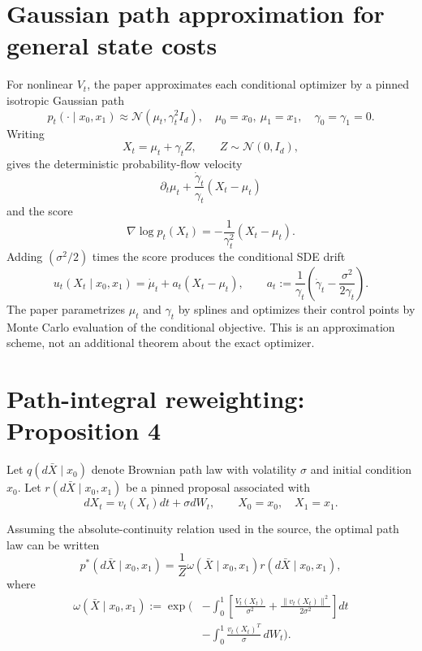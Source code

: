 \section{Gaussian path approximation for general state costs}
For nonlinear $V_t$, the paper approximates each conditional optimizer by a
pinned isotropic Gaussian path
\begin{equation}
  p_t(\cdot\mid x_0,x_1)
  \approx\mathcal N(\mu_t,\gamma_t^2I_d),
  \quad
  \mu_0=x_0,\ \mu_1=x_1,
  \quad
  \gamma_0=\gamma_1=0.
  \tag{7}\label{eq:gsbm-gaussian-path}
\end{equation}
Writing
\[
  X_t=\mu_t+\gamma_t Z,
  \qquad Z\sim\mathcal N(0,I_d),
\]
gives the deterministic probability-flow velocity
\[
  \partial_t\mu_t+\frac{\dot\gamma_t}{\gamma_t}(X_t-\mu_t)
\]
and the score
\[
  \nabla\log p_t(X_t)=-\frac{1}{\gamma_t^2}(X_t-\mu_t).
\]
Adding $(\sigma^2/2)$ times the score produces the conditional SDE drift
\begin{equation}
  u_t(X_t\mid x_0,x_1)
  =\dot\mu_t+a_t(X_t-\mu_t),
  \qquad
  a_t:=\frac1{\gamma_t}
  \left(\dot\gamma_t-\frac{\sigma^2}{2\gamma_t}\right).
  \tag{8}\label{eq:gsbm-gaussian-drift}
\end{equation}
The paper parametrizes $\mu_t$ and $\gamma_t$ by splines and optimizes their
control points by Monte Carlo evaluation of the conditional objective.  This is
an approximation scheme, not an additional theorem about the exact optimizer.

\section{Path-integral reweighting: Proposition 4}
Let $q(d\bar X\mid x_0)$ denote Brownian path law with volatility $\sigma$ and
initial condition $x_0$.  Let $r(d\bar X\mid x_0,x_1)$ be a pinned proposal
associated with
\[
  dX_t=v_t(X_t)dt+\sigma dW_t,
  \qquad X_0=x_0,
  \quad X_1=x_1.
\]

\begin{proposition}[Proposition 4]
Assuming the absolute-continuity relation used in the source, the optimal path
law can be written
\begin{equation}
  p^*(d\bar X\mid x_0,x_1)
  =\frac1Z\omega(\bar X\mid x_0,x_1)
    r(d\bar X\mid x_0,x_1),
  \tag{10}\label{eq:gsbm-pi-law}
\end{equation}
where
\begin{equation}
\begin{split}
  \omega(\bar X\mid x_0,x_1)
  :=\exp\Bigg(&-\int_0^1
    \left[
      \frac{V_t(X_t)}{\sigma^2}
      +\frac{\|v_t(X_t)\|^2}{2\sigma^2}
    \right]dt\\
    &-\int_0^1\frac{v_t(X_t)^T}{\sigma}\,dW_t
  \Bigg).
\end{split}
\tag{11}\label{eq:gsbm-pi-weight}
\end{equation}
\end{proposition}

